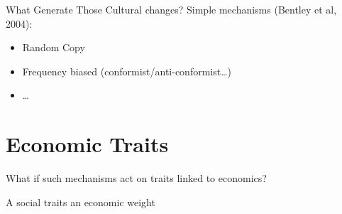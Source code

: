 \documentclass[12pt, notes=show]{beamer}
\begin{document}
\begin{frame}{What Generate Those Cultural changes?}
	Simple mechanisms (Bentley et al, 2004):
	\begin{itemize}
		\item<2->Random Copy 
		\item<3-> Frequency biased (conformist/anti-conformist\dots)
		\item<4->\dots	
	\end{itemize}
\end{frame}

\section{Economic Traits}


\begin{frame}
	\begin{center}
	    What if such mechanisms act on traits linked to economics?
	\end{center}
\end{frame}

\begin{frame}{A social traits an economic weight}
	\begin{center}
	\end{center}
\end{frame}
\end{document}
